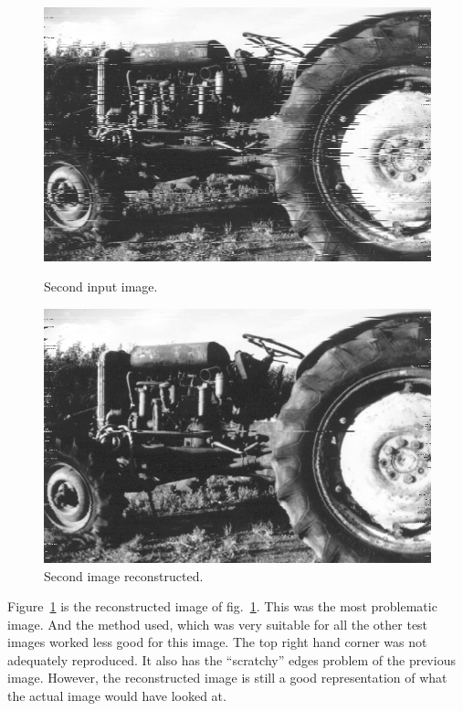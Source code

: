 \documentclass[a4paper,12pt]{article}
\begin{document}
\begin{figure}[h]
\centering
\begin{minipage}{.5\textwidth}
  \centering
  \includegraphics[width=0.95\linewidth]{img/desync2}
  \caption{Second input image.}
  \label{fig.8}
\end{minipage}%
\begin{minipage}{.5\textwidth}
  \centering
  \includegraphics[width=0.95\linewidth]{img/sync2}
  \caption{Second image reconstructed.}
  \label{fig.9}
\end{minipage}
\end{figure}

Figure~\ref{fig.9} is the reconstructed image of fig.~\ref{fig.9}. This was the most problematic image. And the method used, which was very suitable for all the other test images worked less good for this image. The top right hand corner was not adequately reproduced. It also has the ``scratchy'' edges problem of the previous image. However, the reconstructed image is still a good representation of what the actual image would have looked at. 
\end{document}
